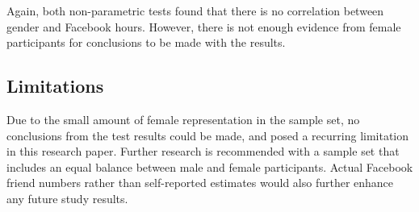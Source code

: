 Again, both non-parametric tests found that there is no correlation between gender and Facebook hours. However, there is not enough evidence from female participants for conclusions to be made with the results.

\subsection{Limitations}

Due to the small amount of female representation in the sample set, no conclusions from the test results could be made, and posed a recurring limitation in this research paper. Further research is recommended with a sample set that includes an equal balance between male and female participants. Actual Facebook friend numbers rather than self-reported estimates would also further enhance any future study results.
